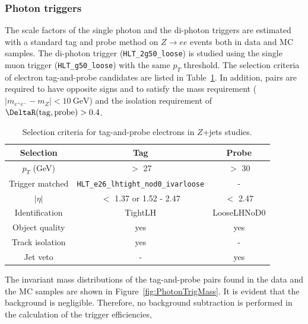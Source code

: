 \subsubsection{Photon triggers}
\label{subsect:photonTrigEff}

The scale factors of the single photon and the di-photon triggers are estimated with a standard tag and probe method on $Z\rightarrow ee$ events both in data and MC samples. The di-photon trigger (\texttt{HLT\_2g50\_loose}) is studied using the single muon trigger (\texttt{HLT\_g50\_loose}) with the same $p_{T}$ threshold. The selection criteria of electron tag-and-probe candidates are listed in Table~\ref{tab:ZeeSelection}. In addition, pairs are required to have opposite signs and to satisfy the mass requirement ($|m_{e^{+}e^{-}} - m_{Z}| < 10~\si{\GeV}$) and the isolation requirement of $\DeltaR(\mathrm{tag}, \mathrm{probe}) > 0.4$. 

\begin{table}[!htb]
	\centering
	\begin{tabular}{ccc}
		\hline
		\hline
		Selection               & Tag                                           & Probe         \\
		\hline
		$p_{T}$ (GeV)           & $>$ 27                                        & $>$ 30        \\
		Trigger matched         & \texttt{HLT\_e26\_lhtight\_nod0\_ivarloose}   & -             \\
		$|\eta|$                & $<$ 1.37 or 1.52 - 2.47                       & $<$ 2.47      \\
		Identification          & TightLH                                       & LooseLHNoD0   \\
		Object quality          & yes                                           & yes           \\
		Track isolation         & yes                                           & -             \\
		Jet veto                & -                                             & yes           \\
		\hline
		\hline
	\end{tabular}
	\caption{Selection criteria for tag-and-probe electrons in $Z$+jets studies.}
	\label{tab:ZeeSelection}
\end{table}

The invariant mass distributions of the tag-and-probe pairs found in the data and the MC samples are shown in Figure~\ref{fig:PhotonTrigMass}. It is evident that the background is negligible. Therefore, no background subtraction is performed in the calculation of the trigger efficiencies, 


